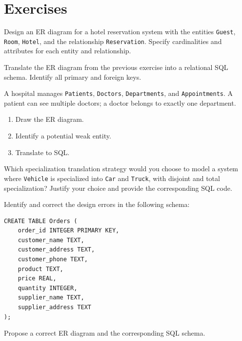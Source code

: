\section*{Exercises}

\begin{exercise}
Design an ER diagram for a hotel reservation system with the entities
\texttt{Guest}, \texttt{Room}, \texttt{Hotel}, and the relationship
\texttt{Reservation}. Specify cardinalities and attributes for each
entity and relationship.
\end{exercise}

\begin{exercise}
Translate the ER diagram from the previous exercise into a relational SQL
schema. Identify all primary and foreign keys.
\end{exercise}

\begin{exercise}
A hospital manages \texttt{Patients}, \texttt{Doctors}, \texttt{Departments},
and \texttt{Appointments}. A patient can see multiple doctors; a doctor
belongs to exactly one department.
\begin{enumerate}
    \item Draw the ER diagram.
    \item Identify a potential weak entity.
    \item Translate to SQL.
\end{enumerate}
\end{exercise}

\begin{exercise}
Which specialization translation strategy would you choose to model a system
where \texttt{Vehicle} is specialized into \texttt{Car} and \texttt{Truck},
with disjoint and total specialization? Justify your choice and provide
the corresponding SQL code.
\end{exercise}

\begin{exercise}
Identify and correct the design errors in the following schema:
\begin{verbatim}
CREATE TABLE Orders (
    order_id INTEGER PRIMARY KEY,
    customer_name TEXT,
    customer_address TEXT,
    customer_phone TEXT,
    product TEXT,
    price REAL,
    quantity INTEGER,
    supplier_name TEXT,
    supplier_address TEXT
);
\end{verbatim}
Propose a correct ER diagram and the corresponding SQL schema.
\end{exercise}
